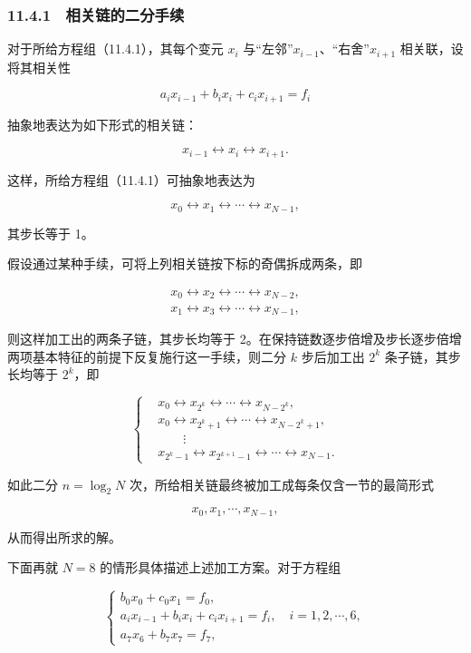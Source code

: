 \subsubsection{11.4.1　相关链的二分手续}\label{ch11-ux76f8ux5173ux94feux7684ux4e8cux5206ux624bux7eed-1}

对于所给方程组（11.4.1），其每个变元 \(x_i\) 与``左邻''\(x_{i-1}\)、``右舍''\(x_{i+1}\) 相关联，设将其相关性

\[
a_ix_{i-1}+b_ix_i+c_ix_{i+1}=f_i
\]

抽象地表达为如下形式的相关链：

\[
x_{i-1}\leftrightarrow x_i\leftrightarrow x_{i+1}.
\]

这样，所给方程组（11.4.1）可抽象地表达为

\[
x_0\leftrightarrow x_1\leftrightarrow\cdots\leftrightarrow x_{N-1},
\]

其步长等于 1。

假设通过某种手续，可将上列相关链按下标的奇偶拆成两条，即

\[
\begin{gathered}
x_0\leftrightarrow x_2\leftrightarrow\cdots\leftrightarrow x_{N-2},\\
x_1\leftrightarrow x_3\leftrightarrow\cdots\leftrightarrow x_{N-1},
\end{gathered}
\]

则这样加工出的两条子链，其步长均等于 2。在保持链数逐步倍增及步长逐步倍增两项基本特征的前提下反复施行这一手续，则二分 \(k\) 步后加工出 \(2^k\) 条子链，其步长均等于 \(2^k\)，即

\[
\left\{
\begin{aligned}
&x_0\leftrightarrow x_{2^k}\leftrightarrow\cdots\leftrightarrow x_{N-2^k},\\
&x_0\leftrightarrow x_{2^k+1}\leftrightarrow\cdots\leftrightarrow x_{N-2^k+1},\\
&\qquad\vdots\\
&x_{2^k-1}\leftrightarrow x_{2^{k+1}-1}\leftrightarrow\cdots\leftrightarrow x_{N-1}.
\end{aligned}
\right.
\tag{11.4.2}
\]

如此二分 \(n=\log_2 N\) 次，所给相关链最终被加工成每条仅含一节的最简形式

\[
x_0,x_1,\cdots,x_{N-1},
\]

从而得出所求的解。

下面再就 \(N=8\) 的情形具体描述上述加工方案。对于方程组

\[
\begin{cases}
b_0x_0+c_0x_1=f_0,\\
a_ix_{i-1}+b_ix_i+c_ix_{i+1}=f_i,\quad i=1,2,\cdots,6,\\
a_7x_6+b_7x_7=f_7,
\end{cases}
\tag{11.4.3}
\]

